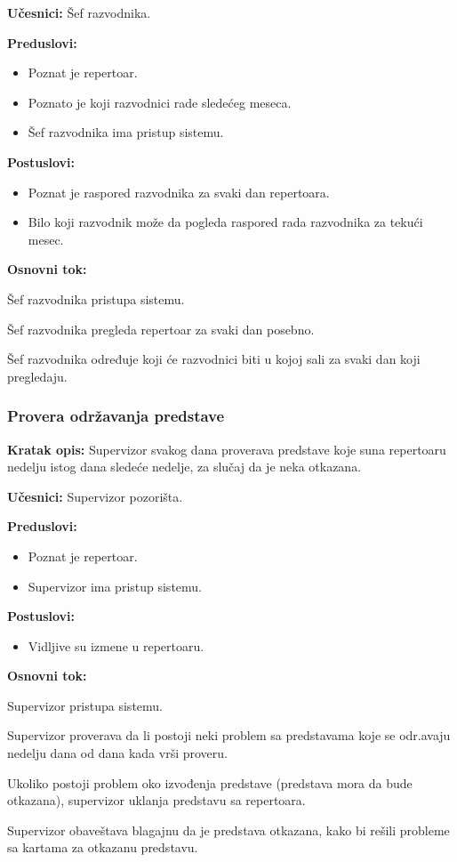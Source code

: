 \documentclass[a4paper]{article}
\begin{document}
\noindent\textbf{Učesnici:} Šef razvodnika.

\noindent\textbf{Preduslovi:}
  \begin{itemize}
    \item Poznat je repertoar.
    \item Poznato je koji razvodnici rade sledećeg meseca.
    \item Šef razvodnika ima pristup sistemu.
  \end{itemize}

\noindent\textbf{Postuslovi:} 
  \begin{itemize}
    \item Poznat je raspored razvodnika za svaki dan repertoara.
    \item Bilo koji razvodnik može da pogleda raspored rada razvodnika za tekući mesec.
  \end{itemize}

\noindent\textbf{Osnovni tok:}
  \begin{legal}
    \item Šef razvodnika pristupa sistemu.
    \item Šef razvodnika pregleda repertoar za svaki dan posebno.
    \item Šef razvodnika određuje koji će razvodnici biti u kojoj sali za svaki dan koji pregledaju.  
  \end{legal}


\subsubsection{Provera održavanja predstave} 
\noindent\textbf{Kratak opis:} Supervizor svakog dana proverava predstave koje suna repertoaru nedelju istog dana sledeće nedelje, za slučaj da je neka otkazana.

\noindent\textbf{Učesnici:} Supervizor pozorišta.

\noindent\textbf{Preduslovi:}
  \begin{itemize}
    \item Poznat je repertoar.
    \item Supervizor ima pristup sistemu.
  \end{itemize}

\noindent\textbf{Postuslovi:} 
  \begin{itemize}
    \item Vidljive su izmene u repertoaru.
  \end{itemize}

\noindent\textbf{Osnovni tok:}
  \begin{legal}
    \item Supervizor pristupa sistemu.
    \item Supervizor proverava da li postoji neki problem sa predstavama koje se odr.avaju nedelju dana od dana kada vrši proveru.
    \item Ukoliko postoji problem oko izvođenja predstave (predstava mora da bude otkazana), supervizor uklanja predstavu sa repertoara.
    \item Supervizor obaveštava blagajnu da je predstava otkazana, kako bi rešili probleme sa kartama za otkazanu predstavu.
  \end{legal}
\end{document}

